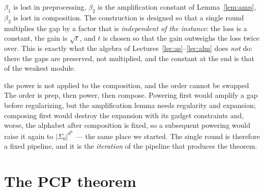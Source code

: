 \begin{remark}\label{rem:three-constants}
$\beta_1$ is lost in preprocessing, $\beta_2$ is the amplification constant of Lemma~\ref{lem:amp}, $\beta_3$ is lost in composition.  The construction is designed so that a single round multiplies the gap by a factor that is \emph{independent of the instance}: the loss is a constant, the gain is $\sqrt t$, and $t$ is chosen so that the gain outweighs the loss twice over.
This is exactly what the algebra of Lectures~\ref{lec:as}--\ref{lec:alm} does \emph{not} do: there the gaps are preserved, not multiplied, and the constant at the end is that of the weakest module.
\end{remark}

\begin{pitfall}{the power is not applied to the composition, and the order cannot be swapped}
The order is $\mathrm{prep}$, then power, then compose.  Powering first would amplify a gap before regularizing, but the amplification lemma needs regularity and expansion; composing first would destroy the expansion with its gadget constraints and, worse, the alphabet after composition is fixed, so a subsequent powering would raise it again to $|\Sigma_0|^{d^{h}}$ --- the same place we started.
The single round is therefore a fixed pipeline, and it is the \emph{iteration} of the pipeline that produces the theorem.
\end{pitfall}


\section{The PCP theorem}
\label{sec:pcp6}

